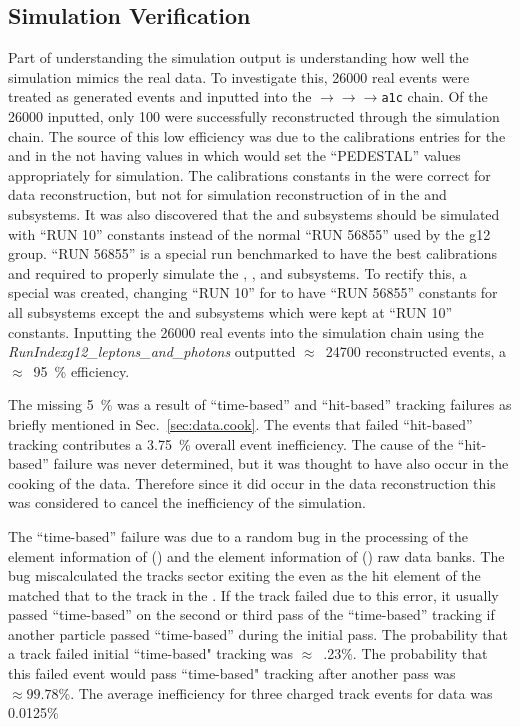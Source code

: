 \subsection{Simulation Verification}\label{sec:analysis.accept.verify}
Part of understanding the simulation output is understanding how well the simulation mimics the real data. To investigate this, 26000 real \epemT events were treated as generated events and inputted into the $\to$$\to$$\to$\texttt{a1c} chain. Of the 26000 inputted, only 100 were successfully reconstructed through the simulation chain. The source of this low efficiency was due to the calibrations entries for the  and  in the  not having values in which would set the ``PEDESTAL'' values appropriately for simulation. The calibrations constants in the  were correct for data reconstruction, but not for simulation reconstruction of \epemT in the  and  subsystems. It was also discovered that the  and  subsystems should be simulated with ``RUN 10'' constants instead of the normal ``RUN 56855'' used by the g12 group. ``RUN 56855'' is a special run benchmarked to have the best calibrations and required to properly simulate the , , and  subsystems. To rectify this, a special  was created, changing ``RUN 10'' for to have ``RUN 56855'' constants for all subsystems except the  and  subsystems which were kept at ``RUN 10'' constants. Inputting the 26000 real \epemT events into the simulation chain using the  \emph{RunIndexg12\_leptons\_and\_photons} outputted $\approx$~24700 \epemT reconstructed events, a $\approx$~95~\% efficiency.

The missing 5~\% was a result of ``time-based'' and ``hit-based'' tracking failures as briefly mentioned in Sec.~\ref{sec:data.cook}. The events that failed ``hit-based'' tracking contributes a 3.75~\% overall event inefficiency. The cause of the ``hit-based'' failure was never determined, but it was thought to have also occur in the cooking of the data. Therefore since it did occur in the data reconstruction this was considered to cancel the inefficiency of the simulation.

The ``time-based'' failure was due to a random bug in the processing of the  element information of  () and the  element information of  () raw data banks. The bug miscalculated the tracks sector exiting the  even as the hit element of the  matched that to the track in the . If the track failed due to this error, it usually passed ``time-based'' on the second or third pass of the ``time-based'' tracking if another particle passed ``time-based'' during the initial pass. The probability that a track failed initial ``time-based" tracking was $\approx$~.23\%. The probability that this failed event would pass ``time-based" tracking after another pass was $\approx99.78\%$. The average inefficiency for three charged track events for data was 0.0125\%

